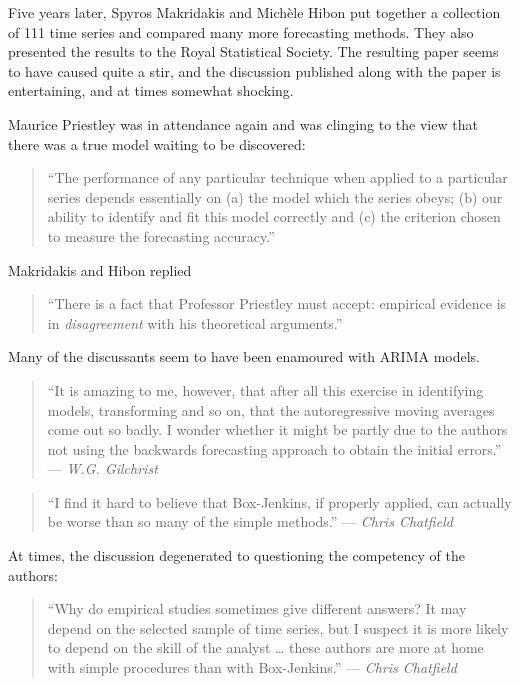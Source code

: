 \documentclass[11pt,a4paper,]{article}
\begin{document}
Five years later, Spyros Makridakis and Michèle Hibon put together a collection of 111 time series and compared many more forecasting methods. They also presented the results to the Royal Statistical Society. The resulting paper \autocite{Makridakis1979} seems to have caused quite a stir, and the discussion published along with the paper is entertaining, and at times somewhat shocking.

Maurice Priestley was in attendance again and was clinging to the view that there was a true model waiting to be discovered:

\begin{quote}
``The performance of any particular technique when applied to a particular series depends essentially on (a) the model which the series obeys; (b) our ability to identify and fit this model correctly and (c) the criterion chosen to measure the forecasting accuracy.''
\end{quote}

Makridakis and Hibon replied

\begin{quote}
``There is a fact that Professor Priestley must accept: empirical evidence is in \emph{disagreement} with his theoretical arguments.''
\end{quote}

Many of the discussants seem to have been enamoured with ARIMA models.

\begin{quote}
``It is amazing to me, however, that after all this exercise in identifying models, transforming and so on, that the autoregressive moving averages come out so badly. I wonder whether it might be partly due to the authors not using the backwards forecasting approach to obtain the initial errors.'' --- \emph{W.G. Gilchrist}
\end{quote}

\begin{quote}
``I find it hard to believe that Box-Jenkins, if properly applied, can actually be worse than so many of the simple methods.'' --- \emph{Chris Chatfield}
\end{quote}

At times, the discussion degenerated to questioning the competency of the authors:

\begin{quote}
``Why do empirical studies sometimes give different answers? It may depend on the selected sample of time series, but I suspect it is more likely to depend on the skill of the analyst \ldots{} these authors are more at home with simple procedures than with Box-Jenkins.'' --- \emph{Chris Chatfield}
\end{quote}
\end{document}
